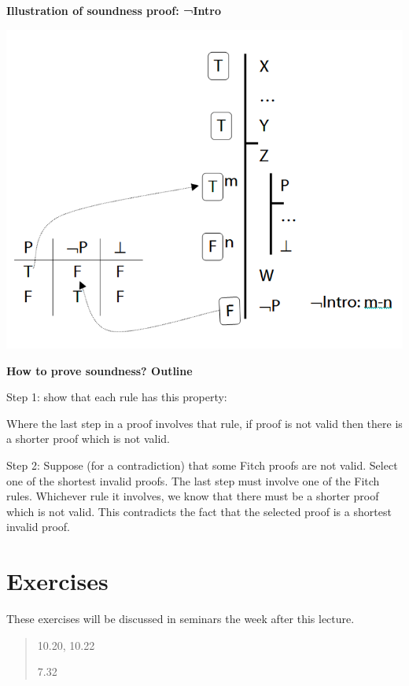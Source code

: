 \documentclass[12pt]{extarticle}
\begin{document}
\begin{multicols*}{3}
\begin{minipage}{\columnwidth}
\textbf{Illustration of soundness proof: ¬Intro}
 
\begin{center}
\includegraphics[scale=0.3]{img/soundness_not.png}
\end{center}
\end{minipage}
 
\begin{minipage}{\columnwidth}
 
\textbf{How to prove soundness? Outline}
 
Step 1: show that each rule has this property:
 
\hspace{5mm} Where the last step in a proof involves that rule, if proof is not valid then there is a shorter proof which is not valid.
 
Step 2: Suppose (for a contradiction) that some Fitch proofs are not valid. Select one of the shortest invalid proofs. The last step must involve one of the Fitch rules. Whichever rule it involves, we know that there must be a shorter proof which is not valid. This contradicts the fact that the selected proof is a shortest invalid proof.
 
\end{minipage}
 
\vfill
\begin{minipage}{\columnwidth}
\section{Exercises}
These exercises will be discussed in seminars the week after this lecture.
 
\begin{quote}
10.20, 10.22
 
7.32
 
\end{quote}
\end{minipage}

 


\end{multicols*}
\end{document}
